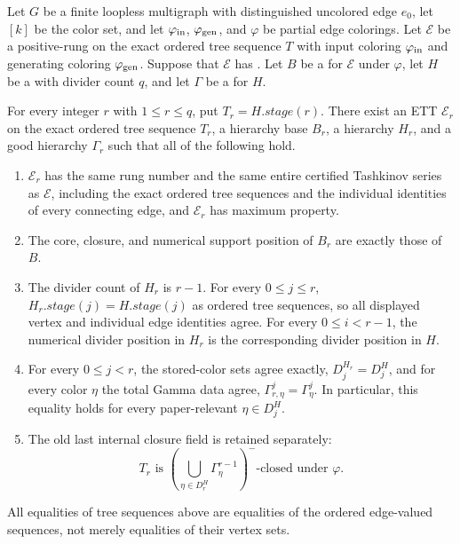 \begin{lemma}
Let $G$ be a finite loopless multigraph with distinguished uncolored edge
$e_0$, let $[k]$ be the color set, and let $\varphi_{\rm in}$,
$\varphi_{\rm gen}$, and $\varphi$ be partial edge colorings.  Let
$\mathcal E$ be a positive-rung  on the
exact ordered tree sequence $T$ with input coloring $\varphi_{\rm in}$ and
generating coloring $\varphi_{\rm gen}$.  Suppose that $\mathcal E$ has
.  Let $B$ be a  for
$\mathcal E$ under $\varphi$, let $H$ be a
 with divider count $q$, and let $\Gamma$ be a
 for $H$.

For every integer $r$ with $1\leq r\leq q$, put $T_r=H.\mathit{stage}(r)$.
There exist an ETT $\mathcal E_r$ on the exact ordered tree sequence $T_r$,
a hierarchy base $B_r$, a hierarchy $H_r$, and a good hierarchy
$\Gamma_r$ such that all of the following hold.
\begin{enumerate}
\item $\mathcal E_r$ has the same rung number and the same entire certified
Tashkinov series as $\mathcal E$, including the exact ordered tree sequences
and the individual identities of every connecting edge, and
$\mathcal E_r$ has maximum property.
\item The core, closure, and numerical support position of $B_r$ are exactly
those of $B$.
\item The divider count of $H_r$ is $r-1$.  For every $0\leq j\leq r$,
$H_r.\mathit{stage}(j)=H.\mathit{stage}(j)$ as ordered tree sequences, so
all displayed vertex and individual edge identities agree.  For every
$0\leq i<r-1$, the numerical divider position in $H_r$ is the corresponding
divider position in $H$.
\item For every $0\leq j<r$, the stored-color sets agree exactly,
$D^{H_r}_j=D^H_j$, and for every color $\eta$ the total Gamma data agree,
$\Gamma^j_{r,\eta}=\Gamma^j_\eta$.  In particular, this equality holds for
every paper-relevant $\eta\in D^H_j$.
\item The old last internal closure field is retained separately:
\[
 T_r\text{ is }
 \left(\bigcup_{\eta\in D^H_r}\Gamma^{r-1}_\eta\right)^{-}
 \text{-closed under }\varphi.
\]
\end{enumerate}
All equalities of tree sequences above are equalities of the ordered
edge-valued sequences, not merely equalities of their vertex sets.
\end{lemma}
